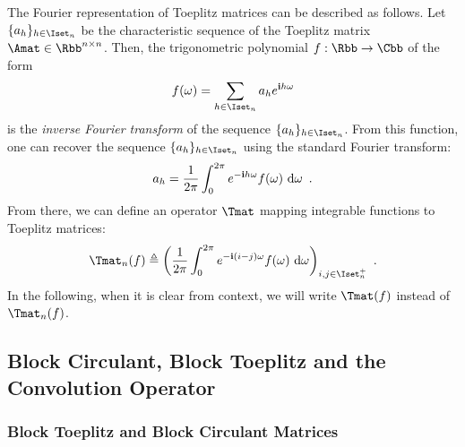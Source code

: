 The Fourier representation of Toeplitz matrices can be described as follows.
Let $\{a_h\}_{h \in \Iset_n}$ be the characteristic sequence of the Toeplitz matrix $\Amat \in \Rbb^{n\times n}$.
Then, the trigonometric polynomial $f: \Rbb \rightarrow \Cbb$ of the form
\begin{equation}
  f(\omega) = \sum_{h \in \Iset_n} a_h e^{\ci h \omega}
\end{equation}
is the \emph{inverse Fourier transform} of the sequence $\{a_h\}_{h \in \Iset_n}$.
From this function, one can recover the sequence $\{a_h\}_{h \in \Iset_n}$ using the standard Fourier transform:
\begin{equation}
  a_h = \frac{1}{2\pi} \int_0^{2\pi} e^{-\mathbf{i} h \omega} f(\omega) \,\mathop{}\!\mathrm{d} \omega \enspace.
\end{equation}
\noindent
From there, we can define an operator $\Tmat$ mapping integrable functions to Toeplitz matrices:
\begin{equation} \label{equation:ch2-toeplitz_operator}
  \Tmat_n(f) \triangleq \leftmat\frac{1}{2\pi} \int_{0}^{2\pi} e^{-\ci(i-j)\omega}f(\omega) \,\diff \omega \rightmat_{i,j \in \Iset^+_n} \enspace.
\end{equation}
In the following, when it is clear from context, we will write $\Tmat(f)$ instead of $\Tmat_n(f)$.





\subsection{Block Circulant, Block Toeplitz and the Convolution Operator}
\label{subsection:ch2-block_toeplitz_and_block_circulant_matrices}

\subsubsection{Block Toeplitz and Block Circulant Matrices}
\label{subsubsection:ch2-block_circulant_and_block_toeplitz_matrices}

